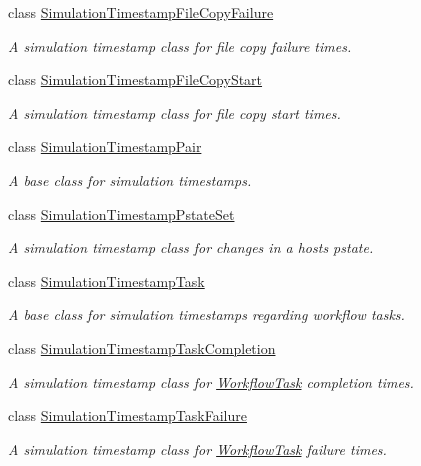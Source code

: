\begin{DoxyCompactItemize}
class \hyperlink{classwrench_1_1_simulation_timestamp_file_copy_failure}{Simulation\+Timestamp\+File\+Copy\+Failure}
\begin{DoxyCompactList}\small\item\em A simulation timestamp class for file copy failure times. \end{DoxyCompactList}\item 
class \hyperlink{classwrench_1_1_simulation_timestamp_file_copy_start}{Simulation\+Timestamp\+File\+Copy\+Start}
\begin{DoxyCompactList}\small\item\em A simulation timestamp class for file copy start times. \end{DoxyCompactList}\item 
class \hyperlink{classwrench_1_1_simulation_timestamp_pair}{Simulation\+Timestamp\+Pair}
\begin{DoxyCompactList}\small\item\em A base class for simulation timestamps. \end{DoxyCompactList}\item 
class \hyperlink{classwrench_1_1_simulation_timestamp_pstate_set}{Simulation\+Timestamp\+Pstate\+Set}
\begin{DoxyCompactList}\small\item\em A simulation timestamp class for changes in a host\textquotesingle{}s pstate. \end{DoxyCompactList}\item 
class \hyperlink{classwrench_1_1_simulation_timestamp_task}{Simulation\+Timestamp\+Task}
\begin{DoxyCompactList}\small\item\em A base class for simulation timestamps regarding workflow tasks. \end{DoxyCompactList}\item 
class \hyperlink{classwrench_1_1_simulation_timestamp_task_completion}{Simulation\+Timestamp\+Task\+Completion}
\begin{DoxyCompactList}\small\item\em A simulation timestamp class for \hyperlink{classwrench_1_1_workflow_task}{Workflow\+Task} completion times. \end{DoxyCompactList}\item 
class \hyperlink{classwrench_1_1_simulation_timestamp_task_failure}{Simulation\+Timestamp\+Task\+Failure}
\begin{DoxyCompactList}\small\item\em A simulation timestamp class for \hyperlink{classwrench_1_1_workflow_task}{Workflow\+Task} failure times. \end{DoxyCompactList}\item 

\end{DoxyCompactItemize}
